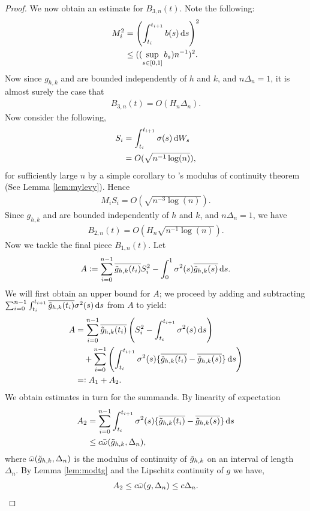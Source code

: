\begin{proof}
We now obtain an estimate for  $B_{3,n}(t)$. Note the following:
\begin{align}
  M_i^2 & = \left(\int_{t_i}^{t_{i+1}} b(s) \D s\right)^2 \notag\\
  & \le ( (\sup_{s \in [0,1]} b_s) n^{-1})^2. 
  \label{eq:m}
\end{align}
 Now since  $g_{h,k}$ and \tghk  are bounded independently of $h$ and $k$, and $n\Delta_n = 1$, it is almost surely the case that 
\begin{align}
  B_{3,n}(t) = O( H_n \Delta_n).
  \label{}
\end{align}
  Now consider the following, 
\begin{align}
  S_i & = \int_{t_i}^{t_{i+1}} \sigma(s) \D W_s\notag \\
  & = O (\sqrt{n^{-1} \log(n)}),\label{eq:rthree}
\end{align}
for sufficiently large $n$ by a simple corollary to \levy's modulus of continuity theorem (See Lemma \ref{lem:mylevy}). Hence
\begin{align}
  M_i S_i = O(\sqrt{n^{-3} \log(n)}).\label{eq:ms}
\end{align}
Since  $g_{h,k}$ and \tghk  are bounded independently of $h$ and $k$, and $n\Delta_n = 1$, we have
\begin{align}
  B_{2,n}(t) = O( H_n \sqrt{n^{-1} \log(n)}).
  \label{}
\end{align}
Now we tackle the final piece $B_{1,n}(t)$. Let 
\begin{align}
  A  := \sum_{i=0}^{n-1}\btghki S_i^2 -\int_{0}^{1} \sigma^2(s) \btghks \D s.
\end{align}
We will first obtain an upper bound for $A$; we proceed by adding and subtracting $\sumin\int_{t_i}^{t_{i+1}}\btghki \sigma^2(s)  \D s$  from  $A$ to yield: 
\begin{align}
  A & = \sumin\btghki \left(S_i^2 -\int_{t_i}^{t_{i+1}} \sigma^2(s) \D s\right)\notag \\
  &\quad +  \sumin\left(\int_{t_i}^{t_{i+1}} \sigma^2(s) \{\btghki - \btghks\} \D s\right) \notag\\
  &=:A_{1} + A_{2} \notag.
  \label{}
\end{align}
We obtain estimates in turn for the summands. By linearity of expectation 
\begin{align}
  A_{2} &= \sumin \int_{t_i}^{t_{i+1}} \sigma^2(s)  \{\btghki - \btghks\} \D s\notag\\
  &\le c\modc{\tghk}{\Delta_n},\notag
  \label{}
\end{align}
where ${\bar{\omega}}({\tilde{g}_{h,k}},\Delta_n)$ is the modulus of continuity of $\tilde{g}_{h,k}$ on an interval of length $\Delta_n$. By  Lemma \eqref{lem:modtg} and the Lipschitz continuity of $g$ we have, 
\begin{align}
  A_{2} \le c{\bar{\omega}}({g},\Delta_n) \le c \Delta_n.\notag 
  \label{}
\end{align}


\end{proof}
